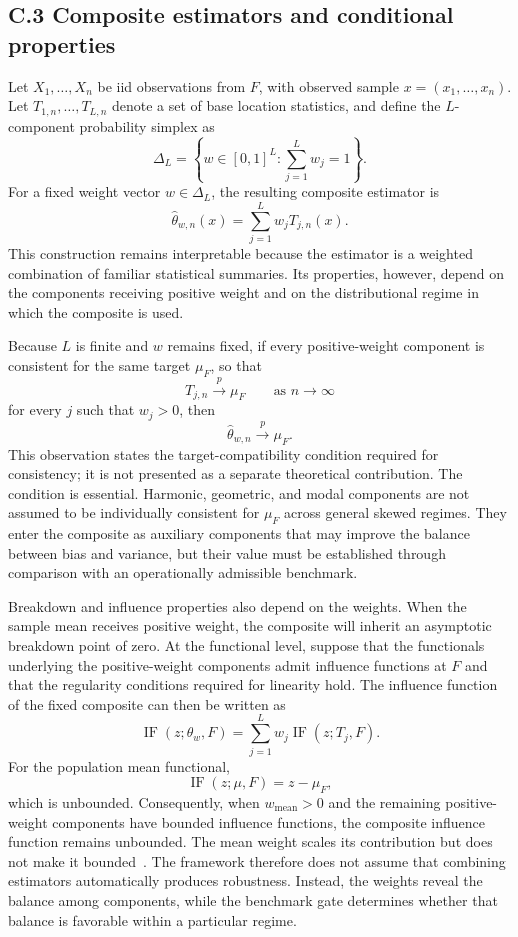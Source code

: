 \subsection*{C.3 Composite estimators and conditional properties}

Let $X_1,\ldots,X_n$ be iid observations from $F$, with observed sample $x=(x_1,\ldots,x_n)$. Let $T_{1,n},\ldots,T_{L,n}$ denote a set of base location statistics, and define the $L$-component probability simplex as
\[
\Delta_L
=
\left\{
w\in[0,1]^L:
\sum_{j=1}^{L}w_j=1
\right\}.
\]
For a fixed weight vector $w\in\Delta_L$, the resulting composite estimator is
\[
\widehat{\theta}_{w,n}(x)
=
\sum_{j=1}^{L}w_jT_{j,n}(x).
\]
This construction remains interpretable because the estimator is a weighted combination of familiar statistical summaries. Its properties, however, depend on the components receiving positive weight and on the distributional regime in which the composite is used.

Because $L$ is finite and $w$ remains fixed, if every positive-weight component is consistent for the same target $\mu_F$, so that
\[
T_{j,n}\xrightarrow{p}\mu_F
\qquad\text{as }n\to\infty
\]
for every $j$ such that $w_j>0$, then
\[
\widehat{\theta}_{w,n}\xrightarrow{p}\mu_F.
\]
This observation states the target-compatibility condition required for consistency; it is not presented as a separate theoretical contribution. The condition is essential. Harmonic, geometric, and modal components are not assumed to be individually consistent for $\mu_F$ across general skewed regimes. They enter the composite as auxiliary components that may improve the balance between bias and variance, but their value must be established through comparison with an operationally admissible benchmark.

Breakdown and influence properties also depend on the weights. When the sample mean receives positive weight, the composite will inherit an asymptotic breakdown point of zero. At the functional level, suppose that the functionals underlying the positive-weight components admit influence functions at $F$ and that the regularity conditions required for linearity hold. The influence function of the fixed composite can then be written as
\[
\operatorname{IF}(z;\theta_w,F)
=
\sum_{j=1}^{L}
w_j\operatorname{IF}(z;T_j,F).
\]
For the population mean functional,
\[
\operatorname{IF}(z;\mu,F)=z-\mu_F,
\]
which is unbounded. Consequently, when $w_{\mathrm{mean}}>0$ and the remaining positive-weight components have bounded influence functions, the composite influence function remains unbounded. The mean weight scales its contribution but does not make it bounded~\citep{hampel1986robust,avellamedina2017influence}. The framework therefore does not assume that combining estimators automatically produces robustness. Instead, the weights reveal the balance among components, while the benchmark gate determines whether that balance is favorable within a particular regime.


